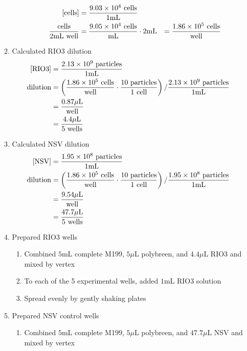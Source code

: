 \begin{enumerate}
\begin{enumerate}
\begin{enumerate}
					\begin{align*}
					\text{[cells]} &= \frac{9.03\times 10^{4}\text{ cells}}{1\text{mL}} \\
					\frac{\text{cells}}{2\text{mL well}} &= \frac{9.05\times 10^{4}\text{ cells}}{\text{mL}} \cdot 2\text{mL} &= \frac{1.86\times 10^{5}\text{ cells}}{\text{well}}\\
					\end{align*}
				\end{enumerate}
			\item Calculated RIO3 dilution
				\begin{align*}
					\text{[RIO3]} &= \frac{2.13\times 10^{9}\text{ particles}}{1\text{mL}}\\
					\text{dilution}&= \left(\frac{1.86\times 10^{5}\text{ cells}}{\text{well}}\cdot \frac{10\text{ particles}}{1\text{ cell}}\right)/\frac{2.13\times 10^{9}\text{ particles}}{1\text{mL}}\\
					&= \frac{0.87\mu\text{L}}{\text{well}}\\
					&= \frac{4.4\mu\text{L}}{5\text{ wells}}
				\end{align*}
			\item Calculated NSV dilution
				\begin{align*}
					\text{[NSV]} &= \frac{1.95\times 10^{8}\text{ particles}}{1\text{mL}}\\
					\text{dilution}&= \left(\frac{1.86\times 10^{5}\text{ cells}}{\text{well}}\cdot \frac{10\text{ particles}}{1\text{ cell}}\right)/\frac{1.95\times 10^{8}\text{ particles}}{1\text{mL}}\\
					&= \frac{9.54\mu\text{L}}{\text{well}}\\
					&= \frac{47.7\mu\text{L}}{5\text{ wells}}
				\end{align*}
			\item Prepared RIO3 wells
				\begin{enumerate}
					\item Combined $5$mL complete M199, $5\mu$L polybreen, and $4.4\mu$L RIO3 and mixed by vertex
					\item To each of the 5 experimental wells, added $1$mL RIO3 solution
					\item Spread evenly by gently shaking plates
				\end{enumerate}
			\item Prepared NSV control wells
				\begin{enumerate}
					\item Combined $5$mL complete M199, $5\mu$L polybreen, and $47.7\mu$L NSV and mixed by vertex

\end{enumerate}
\end{enumerate}
\end{enumerate}
